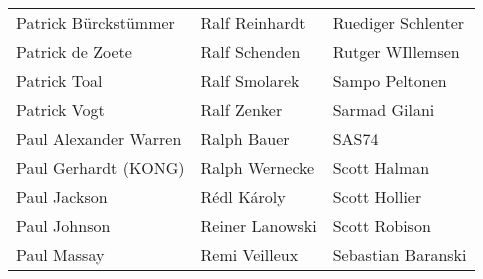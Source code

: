 \begin{tabular}{p{4.5cm}p{4.5cm}p{4.5cm}}
Patrick Bürckstümmer & Ralf Reinhardt & Ruediger Schlenter \\
Patrick de Zoete & Ralf Schenden & Rutger WIllemsen \\
Patrick Toal & Ralf Smolarek & Sampo Peltonen \\
Patrick Vogt & Ralf Zenker & Sarmad Gilani \\
Paul Alexander Warren & Ralph Bauer & SAS74 \\
Paul Gerhardt (KONG) & Ralph Wernecke & Scott Halman \\
Paul Jackson & Rédl Károly & Scott Hollier \\
Paul Johnson & Reiner Lanowski & Scott Robison \\
Paul Massay & Remi Veilleux & Sebastian Baranski \\
\end{tabular}
\newpage
\setlength{\tabcolsep}{1mm}
